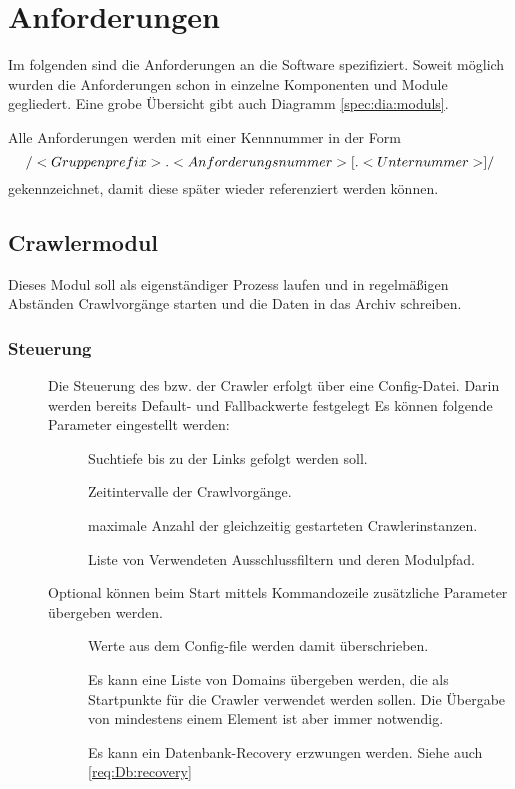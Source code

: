 \chapter{Anforderungen}
Im folgenden sind die Anforderungen an die Software spezifiziert. Soweit möglich wurden
die Anforderungen schon in einzelne Komponenten und Module gegliedert. Eine grobe Übersicht gibt auch Diagramm \ref{spec:dia:moduls}.

Alle Anforderungen werden mit einer Kennnummer in der Form 
\[ \text{/}<Gruppenprefix> . <Anforderungsnummer> [. <Unternummer> ]\text{/} \]
gekennzeichnet, damit diese später wieder referenziert werden können.

\section{Crawlermodul}
Dieses Modul soll als eigenständiger Prozess laufen und in regelmäßigen Abständen Crawlvorgänge starten
und die Daten in das Archiv schreiben.

\subsection{Steuerung}
\begin{description}
	\item []
		Die Steuerung des bzw. der Crawler erfolgt über eine Config-Datei.
		Darin werden bereits Default- und Fallbackwerte festgelegt  
		Es können folgende Parameter eingestellt werden:
		\begin{description}
			\item []
				Suchtiefe bis zu der Links gefolgt werden soll.
			\item []
				Zeitintervalle der Crawlvorgänge.
			\item []
				maximale Anzahl der gleichzeitig gestarteten Crawlerinstanzen.
			\item []
				Liste von Verwendeten Ausschlussfiltern und deren Modulpfad.
		\end{description}
	\item []
		Optional können beim Start mittels Kommandozeile zusätzliche Parameter übergeben werden.
		\begin{description}
			\item []
				Werte aus dem Config-file werden damit überschrieben.
			\item []
				Es kann eine Liste von Domains übergeben werden, 
				die als Startpunkte für die Crawler verwendet werden sollen.
				Die Übergabe von mindestens einem Element ist aber immer notwendig.
			\item []
				Es kann ein Datenbank-Recovery erzwungen werden. Siehe auch \ref{req:Db:recovery}
		\end{description}
\end{description}
